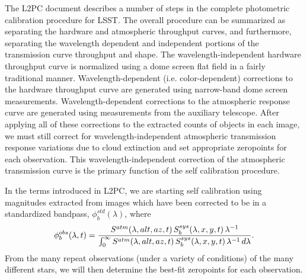 \documentclass[12pt,preprint]{aastex}
\begin{document}
The L2PC document describes a number of steps in the complete
photometric calibration procedure for LSST. The overall procedure can
be summarized as separating the hardware and atmospheric throughput
curves, and furthermore, separating the wavelength dependent and
independent portions of the transmission curve throughput and
shape. The wavelength-independent hardware throughput curve is
normalized using a dome screen flat field in a fairly traditional
manner. Wavelength-dependent (i.e. color-dependent) corrections to the
hardware throughput curve are generated using narrow-band dome screen
measurements. Wavelength-dependent corrections to the atmospheric
response curve are generated using measurements from the auxiliary
telescope. After applying all of these corrections to the extracted
counts of objects in each image, we must still correct for
wavelength-independent atmospheric transmission response variations
due to cloud extinction and set appropriate zeropoints for each
observation. This wavelength-independent correction of the
atmospheric transmission curve is the primary function of the
self calibration procedure.


In the terms introduced in L2PC, we are starting self calibration
using magnitudes extracted from images which have been corrected to be
in a standardized bandpass, $\phi_b^{std}(\lambda)$, where
\begin{equation}
\label{eqn:PhiDef}
	   \phi_b^{obs}(\lambda,t) =  {
	     {S^{atm}(\lambda,alt,az,t)\, S_b^{sys}(\lambda,x,y,t) \,
	       \lambda^{-1}} \over
	     \int_0^\infty { {S^{atm}(\lambda,alt,az,t) \,
	         S_b^{sys}(\lambda,x,y,t) \, \lambda^{-1}} \,d\lambda}}.  
\end{equation}
From the many repeat observations (under a variety of conditions) of the many different stars, we will then determine the best-fit zeropoints for each observation.

\end{document}
